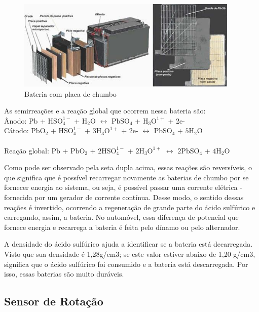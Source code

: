 \begin{figure}[h]
  \centering
  \includegraphics[width=400px, scale=1]{figuras/bateria}
  \caption{Bateria com placa de chumbo}
\end{figure}

As semirreações e a reação global que ocorrem nessa bateria são:\\
Ânodo: $\mathrm{Pb}$ + $\mathrm{HSO_4^{1-}}$ + $\mathrm{H_2 O}$ $\leftrightarrow$
 $\mathrm{PbSO_4}$ + $\mathrm{H_3 O^{1+}}$ + 2e-\\

Cátodo: $\mathrm{Pb O_2}$ + $\mathrm{HSO_4^{1-}}$ + $\mathrm{3 H_3 O^{1+}}$ +
2e- $\leftrightarrow$ $\mathrm{PbSO_4}$ + $\mathrm{5 H_2 O}$\\

\dotfill\\
Reação global: $\mathrm{Pb}$ + $\mathrm{PbO_2}$ + $\mathrm{2HSO_4^{1-}}$ +
$\mathrm{2H_3 O^{1+}}$ $\leftrightarrow$ $\mathrm{2PbSO_4}$ + $\mathrm{4 H_2 O}$

Como pode ser observado pela seta dupla acima, essas reações são reversíveis, o
que significa que é possível recarregar novamente as baterias de chumbo por se
fornecer energia ao sistema, ou seja, é possível passar uma corrente elétrica
-fornecida por um gerador de corrente contínua. Desse modo, o sentido dessas
reações é invertido, ocorrendo a regeneração de grande parte do ácido sulfúrico
e carregando, assim, a bateria. No automóvel, essa diferença de potencial que
fornece energia e recarrega a bateria é feita pelo dínamo ou pelo alternador.

A densidade do ácido sulfúrico ajuda a identificar se a bateria está decarregada.
Visto que sua densidade é 1,28g/cm3; se este valor estiver abaixo de 1,20 g/cm3,
significa que o ácido sulfúrico foi consumido e a bateria está descarregada.
Por isso, essas baterias são muito duráveis.



\subsection{Sensor de Rotação}

